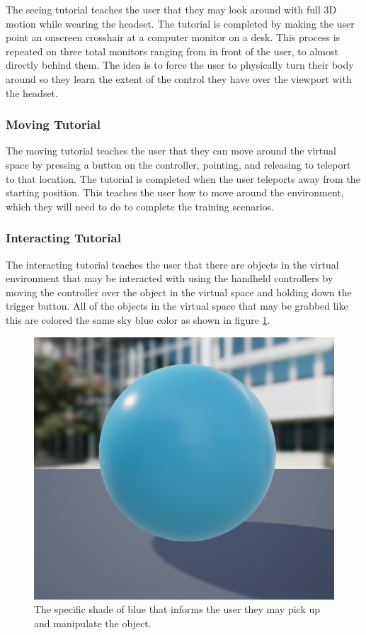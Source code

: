 \documentclass[onecolumn, draftclsnofoot,10pt, compsoc]{IEEEtran}
\begin{document}
The seeing tutorial teaches the user that they may look around with full 3D motion while wearing the headset. The tutorial is completed by making the user point an onscreen crosshair at a computer monitor on a desk. This process is repeated on three total monitors ranging from in front of the user, to almost directly behind them. The idea is to force the user to physically turn their body around so they learn the extent of the control they have over the viewport with the headset.



\subsubsection{Moving Tutorial}
The moving tutorial teaches the user that they can move around the virtual space by pressing a button on the controller, pointing, and releasing to teleport to that location. The tutorial is completed when the user teleports away from the starting position. This teaches the user how to move around the environment, which they will need to do to complete the training scenarios.   

\subsubsection{Interacting Tutorial}

The interacting tutorial teaches the user that there are objects in the virtual environment that may be interacted with using the handheld controllers by moving the controller over the object in the virtual space and holding down the trigger button. All of the objects in the virtual space that may be grabbed like this are colored the same sky blue color as shown in figure \ref{fig:skyblue}.

\begin{figure}[ht!]
    \centering
    \includegraphics[scale=0.5]{touchMeBlue.png}
    \caption{The specific shade of blue that informs the user they may pick up and manipulate the object.}
    \label{fig:skyblue}
\end{figure}
\end{document}
